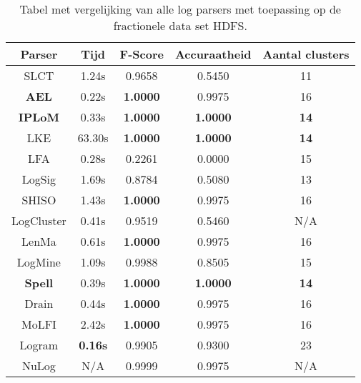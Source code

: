\begin{table}[!htp]
    \caption{Tabel met vergelijking van alle log parsers met toepassing op de fractionele data set HDFS.}
    \label{table:HDFS}
    \begin{center}
        \begin{tabular}{||c | c | c | c | c||} 
            \hline
            Parser & Tijd & F-Score & Accuraatheid & Aantal clusters \\ [0.5ex] 
            \hline\hline
            SLCT & 1.24s & 0.9658 & 0.5450 & 11 \\
            
            \textbf{AEL} & 0.22s & \textbf{1.0000} & 0.9975 & 16 \\ 
            
            \textbf{IPLoM} & 0.33s & \textbf{1.0000} & \textbf{1.0000} & \textbf{14} \\
            
            LKE & 63.30s & \textbf{1.0000} & \textbf{1.0000} & \textbf{14}  \\
            
            LFA & 0.28s & 0.2261 & 0.0000 & 15 \\
            
            LogSig & 1.69s & 0.8784 & 0.5080 & 13 \\
            
            SHISO & 1.43s & \textbf{1.0000} & 0.9975 & 16 \\
            
            LogCluster & 0.41s & 0.9519 & 0.5460 & N/A \\
            
            LenMa & 0.61s & \textbf{1.0000} & 0.9975 & 16 \\
            
            LogMine & 1.09s & 0.9988 & 0.8505 & 15 \\
            
            \textbf{Spell} & 0.39s & \textbf{1.0000} & \textbf{1.0000} & \textbf{14} \\
            
            Drain & 0.44s & \textbf{1.0000} & 0.9975 & 16 \\
            
            MoLFI & 2.42s & \textbf{1.0000} & 0.9975 & 16 \\
            
            Logram & \textbf{0.16s} & 0.9905 & 0.9300 & 23 \\
            
            NuLog & N/A & 0.9999 & 0.9975 & N/A \\
            \hline
        \end{tabular}
    \end{center}
\end{table}

